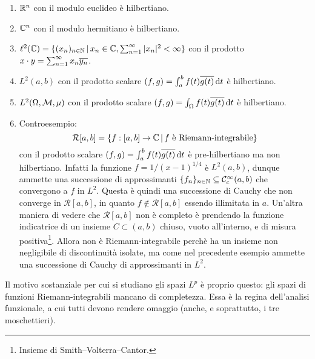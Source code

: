 \begin{example}
	\leavevmode
	\begin{enumerate}
		\item $\mathbb{R}^n$ con il modulo euclideo è hilbertiano.
		\item $\mathbb{C}^n$ con il modulo hermitiano è hilbertiano.
		\item $\ell^2(\mathbb{C}) = \{ (x_n)_{n \in \mathbb{N}} \,|\, x_n \in \mathbb{C}, \sum_{n=1}^\infty |x_n|^2 < \infty\}$ con il prodotto $x \cdot y = \sum_{n=1}^\infty x_n \overline{y_n}$.
		\item $L^2(a,b)$ con il prodotto scalare $(f,g) = \int_a^b f(t)\overline{g(t)}\,\mathrm{d}t$ è hilbertiano.
		\item $L^2(\Omega, \mathcal{M}, \mu)$ con il prodotto scalare $(f,g) = \int_\Omega f(t)\overline{g(t)}\,\mathrm{d}t$ è hilbertiano.
		\item Controesempio:
		\begin{equation*}
			\mathcal R[a,b] = \{f :[a,b] \to \mathbb{C} \,|\, \text{$f$ è Riemann-integrabile} \}
		\end{equation*}
		con il prodotto scalare $(f,g) = \int_a^b f(t)\overline{g(t)}\,\mathrm{d}t$ è pre-hilbertiano ma non hilbertiano.
		Infatti la funzione $f = 1/(x-1)^{1/4}$ è $L^2(a,b)$, dunque ammette una successione di approssimanti $\{f_n\}_{n \in \mathbb{N}} \subseteq \mathcal{C}^\infty_c(a,b)$ che convergono a $f$ in $L^2$. Questa è quindi una successione di Cauchy che non converge in $\mathcal R[a,b]$, in quanto $f \notin \mathcal R[a,b]$ essendo illimitata in $a$.
		Un'altra maniera di vedere che $\mathcal R[a,b]$ non è completo è prendendo la funzione indicatrice di un insieme $C \subset (a,b)$ chiuso, vuoto all'interno, e di misura positiva\footnote{Insieme di Smith--Volterra--Cantor.}. Allora non è Riemann-integrabile perchè ha un insieme non negligibile di discontinuità isolate, ma come nel precedente esempio ammette una successione di Cauchy di approssimanti in $L^2$.
	\end{enumerate}
\end{example}

\begin{remark}
	Il motivo sostanziale per cui si studiano gli spazi $L^p$ è proprio questo: gli spazi di funzioni Riemann-integrabili mancano di completezza. Essa è la regina dell'analisi funzionale, a cui tutti devono rendere omaggio (anche, e soprattutto, i tre moschettieri).
\end{remark}

